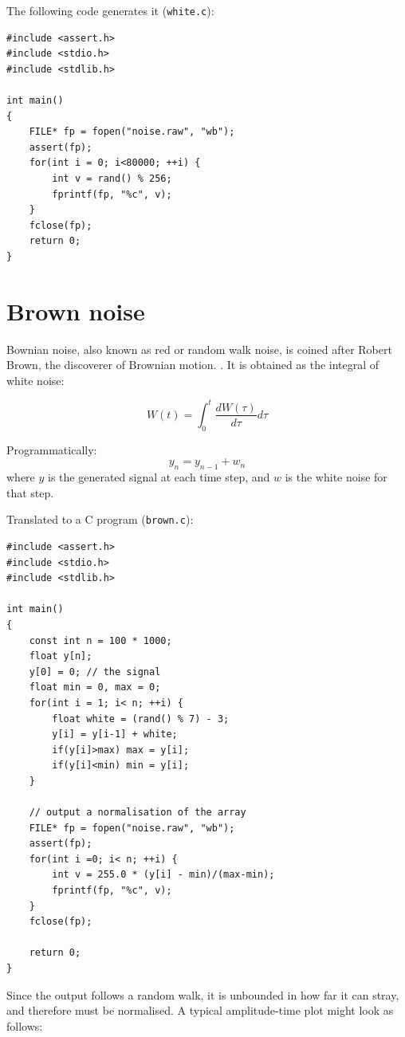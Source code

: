 \documentclass[a4paper,10pt]{article}
\def\code#1{\texttt{#1}}
\begin{document}
The following code generates it (\code{white.c}):
\begin{Verbatim}[tabsize=8]
#include <assert.h>
#include <stdio.h>
#include <stdlib.h>

int main()
{
	FILE* fp = fopen("noise.raw", "wb");
	assert(fp);
	for(int i = 0; i<80000; ++i) {
		int v = rand() % 256;
		fprintf(fp, "%c", v);
	}
	fclose(fp);
	return 0;
}
\end{Verbatim}
%

%
 
\section{Brown noise}

Bownian noise, also known as red or random walk noise, is coined after Robert Brown, the discoverer of Brownian motion. \cite{brown}. It is obtained as the integral of white noise:

\begin{equation}
 W(t) = \int_{0}^{t} \frac{dW(\tau)}{d\tau} d\tau
\end{equation}

Programmatically:
\begin{equation}
 y_{n} = y_{n-1} + w_n
\end{equation}
where $y$ is the generated signal at each time step, and $w$ is the white noise for that step.

Translated to a C program (\code{brown.c}):
\begin{Verbatim}[tabsize=8]
#include <assert.h>
#include <stdio.h>
#include <stdlib.h>

int main()
{
	const int n = 100 * 1000;
	float y[n];
	y[0] = 0; // the signal
	float min = 0, max = 0;
	for(int i = 1; i< n; ++i) {
		float white = (rand() % 7) - 3;
		y[i] = y[i-1] + white;
		if(y[i]>max) max = y[i];
		if(y[i]<min) min = y[i];
	}

	// output a normalisation of the array
	FILE* fp = fopen("noise.raw", "wb");
	assert(fp);
	for(int i =0; i< n; ++i) {
		int v = 255.0 * (y[i] - min)/(max-min);
		fprintf(fp, "%c", v);
	}
	fclose(fp);

	return 0;
}
\end{Verbatim}
Since the output follows a random walk, it is unbounded in how far it can stray, and therefore must be normalised. A typical amplitude-time plot might look as follows:
\end{document}
